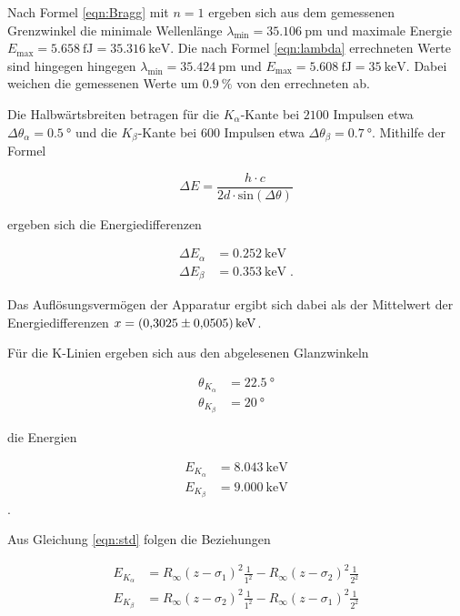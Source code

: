 Nach Formel \eqref{eqn:Bragg} mit $n = 1$ ergeben sich aus dem gemessenen Grenzwinkel die 
minimale Wellenlänge $\lambda_\text{min} = \SI{35.106}{\pico\meter}$ und maximale
Energie $E_\text{max} = \SI{5.658}{\femto\joule} = \SI{35.316}{\kilo\eV}$.
Die nach Formel \eqref{eqn:lambda} errechneten Werte sind hingegen hingegen
$\lambda_\text{min} = \SI{35.424}{\pico\meter}$ und 
$E_\text{max} = \SI{5.608}{\femto\joule} = \SI{35}{\kilo\eV}$.
Dabei weichen die gemessenen Werte um $\SI{0.9}{\percent}$ von den errechneten ab.

Die Halbwärtsbreiten betragen für die $K_\alpha$-Kante bei $2100$ Impulsen
etwa $\Delta \theta_\alpha = \SI{0.5}{\degree}$ und die $K_\beta$-Kante bei $600$ Impulsen
etwa $\Delta \theta_\beta = \SI{0.7}{\degree}$.
Mithilfe der Formel

\begin{equation}
  \Delta E = \frac{h \cdot c}{2d \cdot \text{sin}\left(\Delta \theta \right)}
\end{equation}

ergeben sich die Energiedifferenzen 

\begin{align*}
  \Delta E_\alpha &= \SI{0.252}{\kilo\eV} \\
  \Delta E_\beta &= \SI{0.353}{\kilo\eV}  \; .
\end{align*}

Das Auflösungsvermögen der Apparatur ergibt sich dabei als der Mittelwert der 
Energiedifferenzen $ x = \SI{0.3025 +- 0.0505}{\kilo\eV}$.

Für die K-Linien ergeben sich aus den abgelesenen Glanzwinkeln 

\begin{align*}
  \theta_{K_\alpha} &= \SI{22.5}{\degree} \\
  \theta_{K_\beta} &= \SI{20}{\degree}
\end{align*}

die Energien 

\begin{align*}
E_{K_\alpha} &= \SI{8.043}{\kilo\eV} \\
E_{K_\beta} &= \SI{9.000}{\kilo\eV} 
\end{align*}.

Aus Gleichung \eqref{eqn:std} folgen die Beziehungen

\begin{align*}
  E_{K_\alpha} &= R_\infty {(z - \sigma_1)}^2  \frac{1}{1^2} 
  - R_\infty {(z - \sigma_2)}^2  \frac{1}{2^2} \\
  E_{K_\beta} &= R_\infty {(z - \sigma_2)}^2  \frac{1}{1^2}
  - R_\infty {(z - \sigma_1)}^2  \frac{1}{2^2}
\end{align*}

